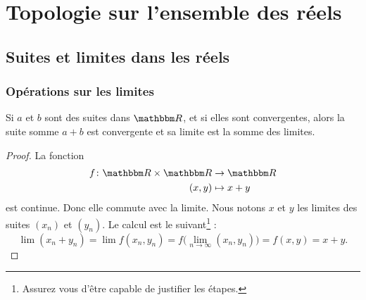
\section{Topologie sur l'ensemble des réels}

\subsection{Suites et limites dans les réels}

\label{SECooLLUGooOwZRyI}


\subsubsection{Opérations sur les limites}

\begin{lemma}       \label{LEMooSFBLooKSXiyj}
    Si \( a\) et \( b\) sont des suites dans \( \eR\), et si elles sont convergentes, alors la suite somme \( a+b\) est convergente et sa limite est la somme des limites.
\end{lemma}

\begin{proof}
    La fonction 
    \begin{equation}
        \begin{aligned}
            f\colon \eR\times \eR&\to \eR \\
            (x,y)&\mapsto x+y 
        \end{aligned}
    \end{equation}
    est continue. Donc elle commute avec la limite. Nous notons \( x\) et \( y\) les limites des suites \( (x_n)\) et \( (y_n)\). Le calcul est le suivant\footnote{Assurez vous d'être capable de justifier les étapes.} :
    \begin{equation}
        \lim (x_n+y_n)=\lim f(x_n,y_n)=f\big( \lim_{n\to \infty} (x_n,y_n) \big)=f(x,y)=x+y.
    \end{equation}
\end{proof}

